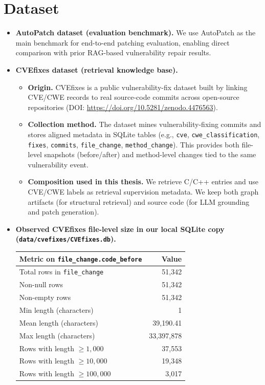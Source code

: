 \documentclass[11pt, a4paper]{article}
\begin{document}
\section{Dataset}
\begin{itemize}[leftmargin=*]
  \item \textbf{AutoPatch dataset (evaluation benchmark).}
  We use AutoPatch as the main benchmark for end-to-end patching evaluation, enabling direct comparison with prior RAG-based vulnerability repair results.

  \item \textbf{CVEfixes dataset (retrieval knowledge base).}
  \begin{itemize}[leftmargin=*]
    \item \textbf{Origin.} CVEfixes is a public vulnerability-fix dataset built by linking CVE/CWE records to real source-code commits across open-source repositories (DOI: \url{https://doi.org/10.5281/zenodo.4476563}).
    \item \textbf{Collection method.} The dataset mines vulnerability-fixing commits and stores aligned metadata in SQLite tables (e.g., \texttt{cve}, \texttt{cwe\_classification}, \texttt{fixes}, \texttt{commits}, \texttt{file\_change}, \texttt{method\_change}). This provides both file-level snapshots (before/after) and method-level changes tied to the same vulnerability event.
    \item \textbf{Composition used in this thesis.} We retrieve C/C++ entries and use CVE/CWE labels as retrieval supervision metadata. We keep both graph artifacts (for structural retrieval) and source code (for LLM grounding and patch generation).
  \end{itemize}

  \item \textbf{Observed CVEfixes file-level size in our local SQLite copy (\texttt{data/cvefixes/CVEfixes.db}).}
  \begin{center}
  \small
  \renewcommand{\arraystretch}{1.2}
  \begin{tabular}{lr}
    \toprule
    \textbf{Metric on \texttt{file\_change.code\_before}} & \textbf{Value} \\
    \midrule
    Total rows in \texttt{file\_change} & 51,342 \\
    Non-null rows & 51,342 \\
    Non-empty rows & 51,342 \\
    Min length (characters) & 1 \\
    Mean length (characters) & 39,190.41 \\
    Max length (characters) & 33,397,878 \\
    Rows with length $\geq 1{,}000$ & 37,553 \\
    Rows with length $\geq 10{,}000$ & 19,348 \\
    Rows with length $\geq 100{,}000$ & 3,017 \\
    \bottomrule
  \end{tabular}
  \end{center}


\end{itemize}
\end{document}
